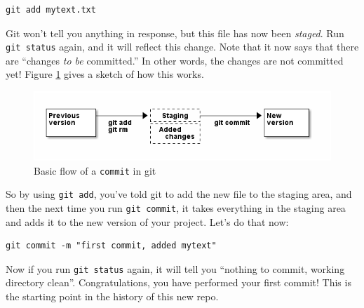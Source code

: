\documentclass{article}
\begin{document}
\begin{verbatim}
git add mytext.txt
\end{verbatim}

Git won't tell you anything in response, but this file has now been \emph{staged}. Run \texttt{git status} again, and it will reflect this change.  Note that it now says that there are ``changes \emph{to be} committed.''  In other words, the changes are not committed yet! Figure \ref{fig-flow} gives a sketch of how this works.



\begin{figure}[h!]
\caption{Basic flow of a \texttt{commit} in git}
\label{fig-flow}
\centering
\includegraphics[width=4.5in]{commitflow1.png}
\end{figure}

So by using \texttt{git add}, you've told git to add the new file to the staging area, and then the next time you run \texttt{git commit}, it takes everything in the staging area and adds it to the new version of your project.  Let's do that now:


\begin{verbatim}
git commit -m "first commit, added mytext"
\end{verbatim}

Now if you run \texttt{git status} again, it will tell you ``nothing to commit, working directory clean''.  Congratulations, you have performed your first commit!  This is the starting point in the history of this new repo. 
\end{document}

